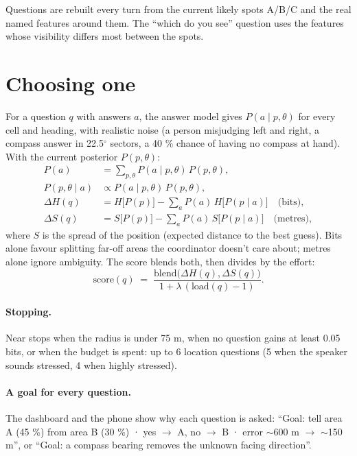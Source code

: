 Questions are rebuilt every turn from the current likely spots A/B/C and the real named features around
them. The ``which do you see'' question uses the features whose visibility differs most between the spots.

\section{Choosing one}

For a question $q$ with answers $a$, the answer model gives $P(a \mid p, \theta)$ for every cell and
heading, with realistic noise (a person misjudging left and right, a compass answer in 22.5$^\circ$
sectors, a 40 \% chance of having no compass at hand). With the current posterior $P(p,\theta)$:
\begin{align}
  P(a) &= \sum_{p,\theta} P(a \mid p,\theta)\,P(p,\theta), \\
  P(p,\theta \mid a) &\propto P(a \mid p,\theta)\,P(p,\theta), \\
  \Delta H(q) &= H\big[P(p)\big] - \sum_a P(a)\, H\big[P(p \mid a)\big] \quad\text{(bits)}, \\
  \Delta S(q) &= S\big[P(p)\big] - \sum_a P(a)\, S\big[P(p \mid a)\big] \quad\text{(metres)},
\end{align}
where $S$ is the spread of the position (expected distance to the best guess). Bits alone favour
splitting far-off areas the coordinator doesn't care about; metres alone ignore ambiguity. The score
blends both, then divides by the effort:
\begin{equation}
  \text{score}(q) \;=\; \frac{\text{blend}\big(\Delta H(q), \Delta S(q)\big)}{1 + \lambda\,(\text{load}(q) - 1)} .
\end{equation}

\paragraph{Stopping.} Near stops when the radius is under 75 m, when no question gains at least 0.05 bits,
or when the budget is spent: up to 6 location questions (5 when the speaker sounds stressed, 4 when highly
stressed).

\paragraph{A goal for every question.} The dashboard and the phone show why each question is asked: ``Goal:
tell area A (45 \%) from area B (30 \%) · yes $\rightarrow$ A, no $\rightarrow$ B · error $\sim$600 m $\rightarrow$ $\sim$150 m'',
or ``Goal: a compass bearing removes the unknown facing direction''.

